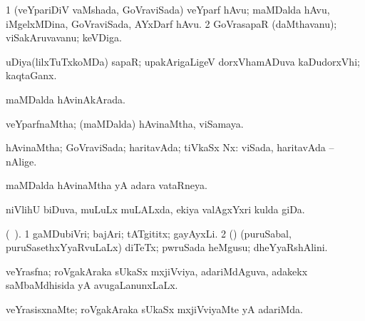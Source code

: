 {{{{{{{{\bentry
{}
\gl{\saMkiSx}
\expl{}
\bmng
\emng
\eentry

\bentry
{} 
\gl{\nA}
\expl{}
\bmng
\bnum
\num{1} (veYpariDiV vaMshada, GoVraviSada) veYparf hAvu; maMDalda hAvu, \kanmu\  iMgelxMDina, GoVraviSada, AYxDarf hAvu. 
\num{2} GoVrasapaR (daMthavanu); viSakAruvavanu; keVDiga. 
\enum
\emng

\noindent 
\gl{\pagu}
\expl{}
\bmng
  uDiya(lilxTuTxkoMDa) sapaR; upakArigaLigeV dorxVhamADuva kaDudorxVhi; kaqtaGanx. 
\emng
\eentry

\bentry
{} 
\gl{\gu}
\expl{}
\bmng
 maMDalda hAvinAkArada. 
\emng
\eentry

\bentry
{} 
\gl{\gu}
\expl{}
\bmng
 veYparfnaMtha; (maMDalda) hAvinaMtha, viSamaya. 
\emng
\eentry

\bentry
{} 
\gl{\gu}
\expl{}
\bmng
 hAvinaMtha; GoVraviSada; haritavAda; tiVkaSx Nx:  viSada, haritavAda -- nAlige. 
\emng
\eentry

\bentry
{} 
\gl{\gu}
\expl{}
\bmng
 maMDalda hAvinaMtha yA adara vataRneya. 
\emng
\eentry

\bentry
{} 
\gl{\gu}
\expl{}
\bmng
\emng
\eentry

\bentry
{} 
\gl{\nA}
\expl{}
\bmng
 niVlihU biDuva, muLuLx muLALxda, ekiya valAgxYxri kulda giDa. 
\emng
\eentry

\bentry
{}
\gl{\nA}
\expl{}
\bmng
\emng
\eentry

\bentry
{} 
\gl{\nA}(\bava\ ). 
\bmng
\bnum
\num{1} gaMDubiVri; bajAri; tATgititx; gayAyxLi. 
\num{2} (\pArxparx) (puruSabal, puruSasethxYyaRvuLaLx) diTeTx; pwruSada heMgusu; dheYyaRshAlini. 
\enum
\emng
\eentry

\bentry
{} 
\gl{\gu}
\expl{}
\bmng
veYrasfna; roVgakAraka sUkaSx mxjiVviya, adariMdAguva, adakekx saMbaMdhisida yA avugaLanunxLaLx. 
\emng
\eentry

\bentry 
{} 
\gl{\kirxvi}
\expl{}
\bmng
 veYrasisxnaMte; roVgakAraka sUkaSx mxjiVviyaMte yA adariMda. 
\emng
\eentry

}}}}}}}}
